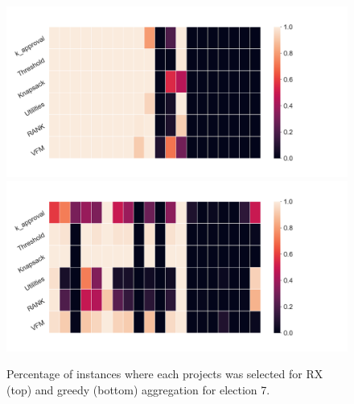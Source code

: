 \documentclass[10pt]{article}
\begin{document}
\begin{appendices}
\begin{figure}[!htbp]
\begin{center}
\includegraphics[width=18cm]{experiment/election_7_rx.png}
\includegraphics[width=18cm]{experiment/election_7_greedy.png}

\caption{Percentage of instances where each projects was selected for RX (top) and greedy (bottom)
aggregation for election 7.
}\label{fig:stability7}
\end{center}
\end{figure}


\end{appendices}
\end{document}
